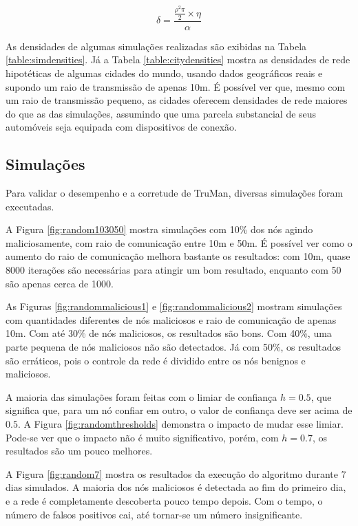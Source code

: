 \begin{resumoextendido}
	$$ \delta = \frac{\frac{\rho^2\pi}{2} \times \eta}{\alpha} $$
	
	As densidades de algumas simulações realizadas são exibidas na Tabela \ref{table:simdensities}.
	Já a Tabela \ref{table:citydensities} mostra as densidades de rede hipotéticas de algumas cidades do mundo, usando dados geográficos reais e supondo um raio de transmissão de apenas 10m.
	É possível ver que, mesmo com um raio de transmissão pequeno, as cidades oferecem densidades de rede maiores do que as das simulações, assumindo que uma parcela substancial de seus automóveis seja equipada com dispositivos de conexão.
	
	\subsection*{Simulações}
	
	Para validar o desempenho e a corretude de TruMan, diversas simulações foram executadas.
	
	A Figura \ref{fig:random103050} mostra simulações com 10\% dos nós agindo maliciosamente, com raio de comunicação entre 10m e 50m.
	É possível ver como o aumento do raio de comunicação melhora bastante os resultados:
	com 10m, quase 8000 iterações são necessárias para atingir um bom resultado, enquanto com 50 são apenas cerca de 1000.
	
	As Figuras \ref{fig:randommalicious1} e \ref{fig:randommalicious2} mostram simulações com quantidades diferentes de nós maliciosos e raio de comunicação de apenas 10m.
	Com até 30\% de nós maliciosos, os resultados são bons.
	Com 40\%, uma parte pequena de nós maliciosos não são detectados.
	Já com 50\%, os resultados são erráticos, pois o controle da rede é dividido entre os nós benignos e maliciosos.
	
	A maioria das simulações foram feitas com o limiar de confiança $h=0.5$, que significa que, para um nó confiar em outro, o valor de confiança deve ser acima de $0.5$.
	A Figura \ref{fig:randomthresholds} demonstra o impacto de mudar esse limiar.
	Pode-se ver que o impacto não é muito significativo, porém, com $h=0.7$, os resultados são um pouco melhores.
	
	A Figura \ref{fig:random7} mostra os resultados da execução do algoritmo durante 7 dias simulados.
	A maioria dos nós maliciosos é detectada ao fim do primeiro dia, e a rede é completamente descoberta pouco tempo depois.
	Com o tempo, o número de falsos positivos cai, até tornar-se um número insignificante.
	

\end{resumoextendido}

